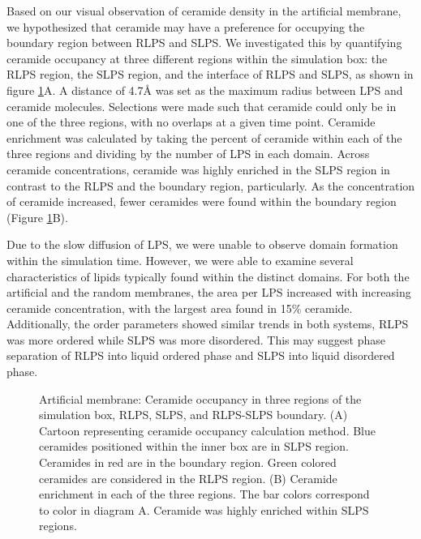 \documentclass[10pt, letterpaper]{article}
\begin{document}
Based on our visual observation of ceramide density in the artificial membrane, we hypothesized that ceramide may have a preference for occupying the boundary region between RLPS and SLPS. We investigated this by quantifying ceramide occupancy at three different regions within the simulation box: the RLPS region, the SLPS region, and the interface of RLPS and SLPS, as shown in figure \ref{fig:number_cer}A. A distance of 4.7\si{\angstrom} was set as the maximum radius between LPS and ceramide molecules. Selections were made such that ceramide could only be in one of the three regions, with no overlaps at a given time point. Ceramide enrichment was calculated by taking the percent of ceramide within each of the three regions and dividing by the number of LPS in each domain. Across ceramide concentrations, ceramide was highly enriched in the SLPS region in contrast to the RLPS and the boundary region, particularly.
As the concentration of ceramide increased, fewer ceramides were found within the boundary region (Figure \ref{fig:number_cer}B). 


Due to the slow diffusion of LPS, we were unable to observe domain formation within the simulation time. However, we were able to examine several characteristics of lipids typically found within the distinct domains. For both the artificial and the random membranes, the area per LPS increased with increasing ceramide concentration, with the largest area found in 15\% ceramide. Additionally, the order parameters showed similar trends in both systems, RLPS was more ordered while SLPS was more disordered. This may suggest phase separation of RLPS into liquid ordered phase and SLPS into liquid disordered phase.  


 \begin{figure}[H]
  \centering
  \caption[Artificial membrane: Ceramide Occupancy]{Artificial membrane: Ceramide occupancy in three regions of the simulation box, RLPS, SLPS, and RLPS-SLPS boundary. (A) Cartoon representing ceramide occupancy calculation method. Blue ceramides positioned within the inner box are in SLPS region. Ceramides in red are in the boundary region. Green colored ceramides are considered in the RLPS region. (B) Ceramide enrichment in each of the three regions. The bar colors correspond to color in diagram A. Ceramide was highly enriched within SLPS regions. 
  }\label{fig:number_cer}
\end{figure}
 
\end{document}
